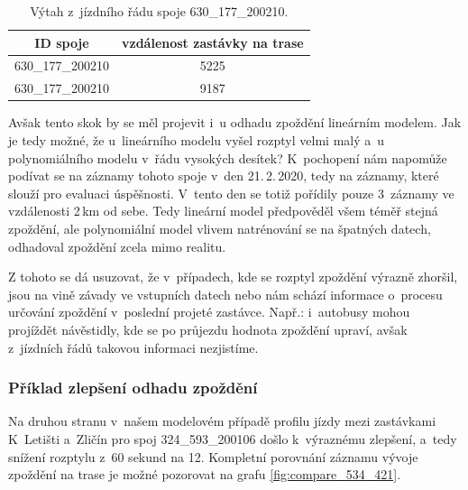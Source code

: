 \begin{center}
   \begin{table}[ht]
\centering
\begin{tabular}{|c|c|}
\hline
ID spoje & vzdálenost zastávky na trase \\ \hline \hline
630\_177\_200210 & 5225 \\ \hline
630\_177\_200210 & 9187 \\ \hline
\end{tabular}
\label{tab:825_ride}
\caption{Výtah z~jízdního řádu spoje 630\_177\_200210.}
\end{table}
\end{center}


\bigbreak

Avšak tento skok by se měl projevit i~u odhadu zpoždění lineárním modelem. Jak je tedy možné, že u~lineárního modelu vyšel rozptyl velmi malý a~u polynomiálního modelu v~řádu vysokých desítek? K~pochopení nám napomůže podívat se na záznamy tohoto spoje v~den 21.\,2.\,2020, tedy na záznamy, které slouží pro evaluaci úspěšnosti. V~tento den se totiž pořídily pouze 3~záznamy ve vzdálenosti 2\,km od sebe. Tedy lineární model předpověděl všem téměř stejná zpoždění, ale polynomiální model vlivem natrénování se na špatných datech, odhadoval zpoždění zcela mimo realitu.


\bigbreak

Z tohoto se dá usuzovat, že v~případech, kde se rozptyl zpoždění výrazně zhoršil, jsou na vině závady ve vstupních datech nebo nám schází informace o~procesu určování zpoždění v~poslední projeté zastávce. Např.: i~autobusy mohou projíždět návěstidly, kde se po průjezdu hodnota zpoždění upraví, avšak z~jízdních řádů takovou informaci nezjistíme.


\subsubsection{Příklad zlepšení odhadu zpoždění}

Na druhou stranu v~našem modelovém případě profilu jízdy mezi zastávkami K~Letišti a~Zličín pro spoj 324\_593\_200106 došlo k~výraznému zlepšení, a~tedy snížení rozptylu z~60 sekund na 12. Kompletní porovnání záznamu vývoje zpoždění na trase je možné pozorovat na grafu \ref{fig:compare_534_421}.


